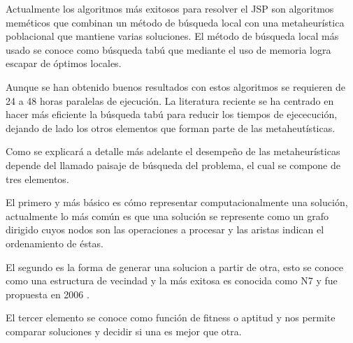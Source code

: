 Actualmente los algoritmos más exitosos para resolver el JSP son algoritmos meméticos que combinan un método de búsqueda local con una metaheurística poblacional que mantiene varias soluciones. El método de búsqueda local más usado se conoce como búsqueda tabú que mediante el uso de memoria logra escapar de óptimos locales.

Aunque se han obtenido buenos resultados con estos algoritmos se requieren de 24 a 48 horas paralelas de ejecución. La literatura reciente se ha centrado en hacer más eficiente la búsqueda tabú para reducir los tiempos de ejececución, dejando de lado los otros elementos que forman parte de las metaheutísticas. 

Como se explicará a detalle más adelante el desempeño de las metaheurísticas depende del llamado paisaje de búsqueda del problema, el cual se compone de tres elementos.

El primero y más básico es cómo representar computacionalmente una solución, actualmente lo más común es que una solución se represente como un grafo dirigido cuyos nodos son las operaciones a procesar y las aristas indican el ordenamiento de éstas.

El segundo es la forma de generar una solucion a partir de otra, esto se conoce como una estructura de vecindad y la más exitosa es conocida como N7 y fue propuesta en 2006 \cite{Zhang2007}. 

El tercer elemento se conoce como función de fitness o aptitud y nos permite comparar soluciones y decidir si una es mejor que otra. 


